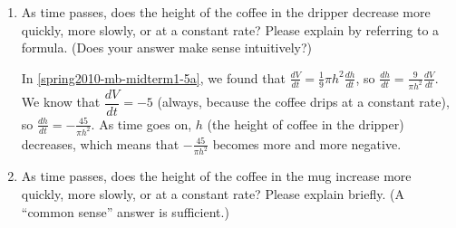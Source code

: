 \documentclass{article}
\begin{document}
\begin{enumerate}
\begin{enumerate}
\begin{solution}

      \[ \frac{dV}{dt} = \frac{1}{9} \pi h^2 \frac{dh}{dt}\]
      \begin{align*}
        -5 &= \frac{1}{9} \pi \left( \frac{3}{2} \right)^2
        \frac{dh}{dt} \\
        &= \frac{1}{4} \pi \frac{dh}{dt} \\
        - \frac{20}{\pi} &= \frac{dh}{dt}
      \end{align*}
      That is, the height of coffee in the filter is .
    \end{solution}

  \item
    \begin{problem}[\vfill]
      As time passes, does the height of the coffee in the dripper
      decrease more quickly, more slowly, or at a constant rate?  Please
      explain by referring to a formula.  (Does your answer make sense
      intuitively?)  
    \end{problem}

    \begin{solution}
      In \ref{spring2010-mb-midterm1-5a}, we found that $\displaystyle
      \frac{dV}{dt} = \frac{1}{9} \pi h^2 \frac{dh}{dt}$, so
      $\displaystyle \frac{dh}{dt} = \frac{9}{\pi h^2} \frac{dV}{dt}$.  We
      know that $\dfrac{dV}{dt} = -5$ (always, because the coffee drips at
      a constant rate), so $\displaystyle \frac{dh}{dt} = - \frac{45}{\pi
        h^2}$.  As time goes on, $h$ (the height of coffee in the dripper)
      decreases, which means that $-\frac{45}{\pi h^2}$ becomes more and
      more negative.  
    \end{solution}

  \item
    \begin{problem}[\vfill]
      As time passes, does the height of the coffee in the mug increase
      more quickly, more slowly, or at a constant rate?  Please explain
      briefly.  (A ``common sense'' answer is sufficient.)
    \end{problem}


\end{enumerate}
\end{enumerate}
\end{document}
